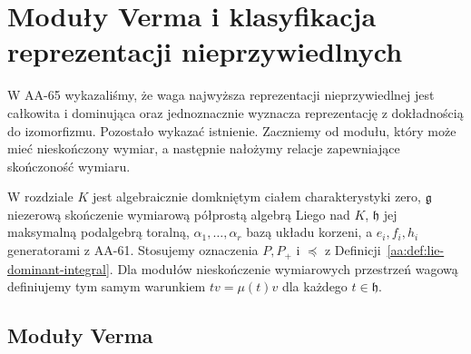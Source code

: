 \chapter[Moduły Verma i klasyfikacja reprezentacji]{Moduły Verma i klasyfikacja reprezentacji nieprzywiedlnych}
\label{aa:ch:lie-highest-existence}

W AA-65 wykazaliśmy, że waga najwyższa reprezentacji nieprzywiedlnej jest całkowita i dominująca oraz jednoznacznie wyznacza reprezentację z dokładnością do izomorfizmu. Pozostało wykazać istnienie. Zaczniemy od modułu, który może mieć nieskończony wymiar, a następnie nałożymy relacje zapewniające skończoność wymiaru.

W rozdziale $K$ jest algebraicznie domkniętym ciałem charakterystyki zero, $\mathfrak g$ niezerową skończenie wymiarową półprostą algebrą Liego nad $K$, $\mathfrak h$ jej maksymalną podalgebrą toralną, $\alpha_1,\ldots,\alpha_r$ bazą układu korzeni, a $e_i,f_i,h_i$ generatorami z AA-61. Stosujemy oznaczenia $P,P_+$ i $\preceq$ z Definicji~\ref{aa:def:lie-dominant-integral}. Dla modułów nieskończenie wymiarowych przestrzeń wagową definiujemy tym samym warunkiem $tv=\mu(t)v$ dla każdego $t\in\mathfrak h$.

\section{Moduły Verma}

